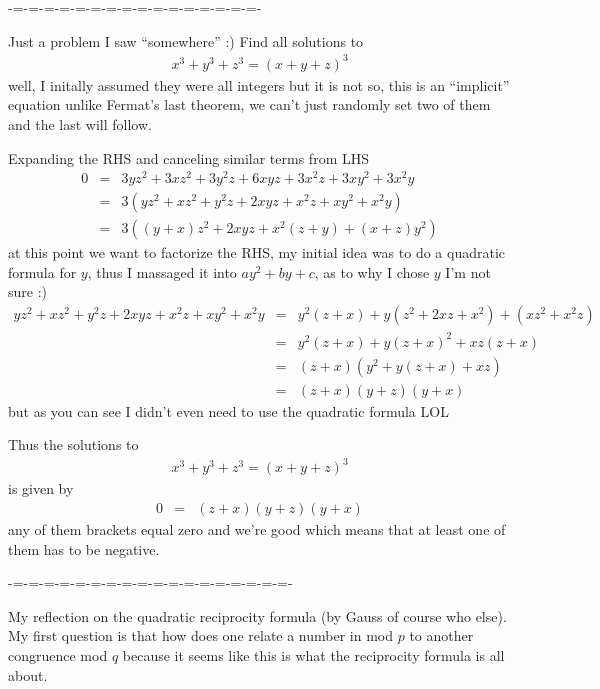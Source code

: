 \documentclass[aps,preprint,preprintnumbers,nofootinbib,showpacs,prd]{revtex4-1}
\newcommand{\nbea}{\begin{eqnarray*}}
\newcommand{\neea}{\end{eqnarray*}}
\begin{document}
-=-=-=-=-=-=-=-=-=-=-=-=-=-=-=-=-

Just a problem I saw ``somewhere'' :) Find all solutions to
%
\nbea
x^3 + y^3 + z^3 = (x + y + z)^3
\neea
%
well, I initally assumed they were all integers but it is not so, this is an ``implicit'' equation unlike Fermat's last theorem, we can't just randomly set two of them and the last will follow.

Expanding the RHS and canceling similar terms from LHS
%
\nbea
0 & = & 3yz^2 + 3xz^2 + 3y^2z + 6xyz + 3x^2z + 3xy^2 + 3x^2y \\
& = & 3 (yz^2 + xz^2 + y^2z + 2xyz + x^2z + xy^2 + x^2y) \\
& = & 3 ((y+x)z^2 + 2xyz + x^2(z+y) + (x+z)y^2 )
\neea
%
at this point we want to factorize the RHS, my initial idea was to do a quadratic formula for $y$, thus I massaged it into $ay^2 + by + c$, as to why I chose $y$ I'm not sure :)
%
\nbea
yz^2 + xz^2 + y^2z + 2xyz + x^2z + xy^2 + x^2y & = & y^2(z + x) + y(z^2 + 2xz + x^2)  + (xz^2 + x^2z) \\
& = & y^2(z + x) + y(z + x)^2  + xz(z + x) \\
& = & (z + x)(y^2 + y(z + x)  + xz) \\
& = & (z + x)(y + z)(y + x)
\neea
%
but as you can see I didn't even need to use the quadratic formula LOL

Thus the solutions to
%
\nbea
x^3 + y^3 + z^3 = (x + y + z)^3
\neea
%
is given by
%
\nbea
0 & = & (z + x)(y + z)(y + x)
\neea
%
any of them brackets equal zero and we're good which means that at least one of them has to be negative.



-=-=-=-=-=-=-=-=-=-=-=-=-=-=-=-=-=-=-

My reflection on the quadratic reciprocity formula (by Gauss of course who else). My first question is that how does one relate a number in mod $p$ to another congruence mod $q$ because it seems like this is what the reciprocity formula is all about.
\end{document}
